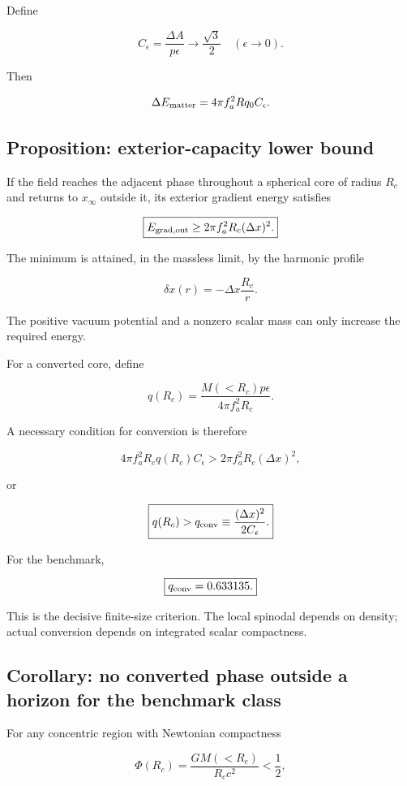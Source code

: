 \documentclass[11pt,a4paper]{article}
\begin{document}
Define

\[
C_\epsilon
=
\frac{\Delta A}{p\epsilon}
\longrightarrow
\frac{\sqrt3}{2}
\quad(\epsilon\rightarrow0).
\]

Then

\[
\Delta E_{\rm matter}
=
4\pi f_a^2Rq_0C_\epsilon.
\]

\subsection{Proposition: exterior-capacity lower
bound}\label{proposition-exterior-capacity-lower-bound}

If the field reaches the adjacent phase throughout a spherical core of
radius \(R_c\) and returns to \(x_\infty\) outside it, its exterior
gradient energy satisfies

\[
\boxed{
E_{\rm grad,out}
\ge
2\pi f_a^2R_c(\Delta x)^2.
}
\]

The minimum is attained, in the massless limit, by the harmonic profile

\[
\delta x(r)=-\Delta x\frac{R_c}{r}.
\]

The positive vacuum potential and a nonzero scalar mass can only
increase the required energy.

For a converted core, define

\[
q(R_c)
=
\frac{M(<R_c)p\epsilon}{4\pi f_a^2R_c}.
\]

A necessary condition for conversion is therefore

\[
4\pi f_a^2R_c q(R_c)C_\epsilon
>
2\pi f_a^2R_c(\Delta x)^2,
\]

or

\[
\boxed{
q(R_c)>q_{\rm conv}
\equiv
\frac{(\Delta x)^2}{2C_\epsilon}.
}
\]

For the benchmark,

\[
\boxed{q_{\rm conv}=0.633135.}
\]

This is the decisive finite-size criterion. The local spinodal depends
on density; actual conversion depends on integrated scalar compactness.

\subsection{Corollary: no converted phase outside a horizon for the
benchmark
class}\label{corollary-no-converted-phase-outside-a-horizon-for-the-benchmark-class}

For any concentric region with Newtonian compactness

\[
\Phi(R_c)=\frac{GM(<R_c)}{R_cc^2}<\frac12,
\]
\end{document}
